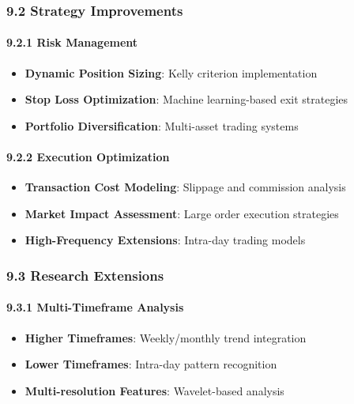 \subsubsection{9.2 Strategy Improvements}\label{strategy-improvements}

\paragraph{9.2.1 Risk Management}\label{risk-management-1}

\begin{itemize}
\tightlist
\item
  \textbf{Dynamic Position Sizing}: Kelly criterion implementation
\item
  \textbf{Stop Loss Optimization}: Machine learning-based exit
  strategies
\item
  \textbf{Portfolio Diversification}: Multi-asset trading systems
\end{itemize}

\paragraph{9.2.2 Execution Optimization}\label{execution-optimization}

\begin{itemize}
\tightlist
\item
  \textbf{Transaction Cost Modeling}: Slippage and commission analysis
\item
  \textbf{Market Impact Assessment}: Large order execution strategies
\item
  \textbf{High-Frequency Extensions}: Intra-day trading models
\end{itemize}

\subsubsection{9.3 Research Extensions}\label{research-extensions}

\paragraph{9.3.1 Multi-Timeframe
Analysis}\label{multi-timeframe-analysis}

\begin{itemize}
\tightlist
\item
  \textbf{Higher Timeframes}: Weekly/monthly trend integration
\item
  \textbf{Lower Timeframes}: Intra-day pattern recognition
\item
  \textbf{Multi-resolution Features}: Wavelet-based analysis
\end{itemize}

